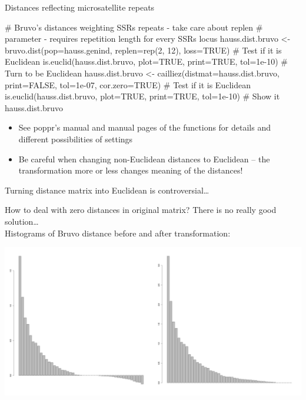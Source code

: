 \documentclass[compress, ucs, xelatex, 11pt, xcolor=svgnames,
  hyperref={
    bookmarks=true,
    unicode=true,
    colorlinks=true,
    pdftitle={Molecular data in R},
    plainpages=false,
    pdfauthor={Vojtech Zeisek},
    pdfsubject={Course about phylogeny and evolution in R},
    pdfcreator={XeLaTeX},
    pdfkeywords={R, evolution, phylogeny, molecular data},
    linkcolor=Tomato,
    anchorcolor=SaddleBrown,
    citecolor=Goldenrod,
    filecolor=DarkMagenta,
    menucolor=Sienna,
    urlcolor=DarkTurquoise,
    pdftex},
  url={hyphens, lowtilde} %
  ]{beamer}
\begin{document}
\begin{frame}[fragile]{Distances reflecting microsatellite repeats}
  \begin{spluscode}
    # Bruvo's distances weighting SSRs repeats - take care about replen
    # parameter - requires repetition length for every SSRs locus
    hauss.dist.bruvo <- bruvo.dist(pop=hauss.genind, replen=rep(2, 12),
      loss=TRUE)
    # Test if it is Euclidean
    is.euclid(hauss.dist.bruvo, plot=TRUE, print=TRUE, tol=1e-10)
    # Turn to be Euclidean
    hauss.dist.bruvo <- cailliez(distmat=hauss.dist.bruvo, print=FALSE,
      tol=1e-07, cor.zero=TRUE)
    # Test if it is Euclidean
    is.euclid(hauss.dist.bruvo, plot=TRUE, print=TRUE, tol=1e-10)
    # Show it
    hauss.dist.bruvo
  \end{spluscode}
  \begin{itemize}
    \item See poppr's manual and manual pages of the functions for details and different possibilities of settings
    \item Be careful when changing non-Euclidean distances to Euclidean -- \alert{the transformation more or less changes meaning of the distances!}
  \end{itemize}
\end{frame}

\begin{frame}{Turning distance matrix into Euclidean is controversial\ldots}
  \begin{footnotesize}
    How to deal with zero distances in original matrix? There is no really good solution\ldots\\ Histograms of Bruvo distance before and after transformation:
  \end{footnotesize}
  \begin{center}
    \includegraphics[width=\textwidth]{bruvodist.png}
  \end{center}
\end{frame}
\end{document}
